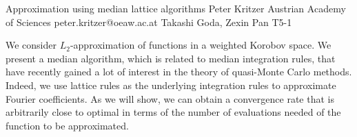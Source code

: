 \begin{talk}
  {Approximation using median lattice algorithms}%
  {Peter Kritzer}%
  {Austrian Academy of Sciences}%
  {peter.kritzer@oeaw.ac.at}%
  {Takashi Goda, Zexin Pan}%
  {T5-1}%
			
We consider $L_2$-approximation of functions in a weighted Korobov space. We present a median algorithm, which is related to median integration rules, that have recently gained a lot of interest in the theory of quasi-Monte Carlo methods. Indeed, we use lattice rules as the underlying integration rules to approximate Fourier coefficients. As we will show, we can obtain a convergence rate that is arbitrarily close to optimal in terms of the number of evaluations needed of the function to be approximated.
\end{talk}

